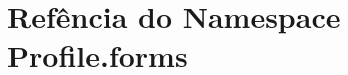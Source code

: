 \hypertarget{namespaceProfile_1_1forms}{\section{Refência do Namespace Profile.\-forms}
\label{namespaceProfile_1_1forms}
}
